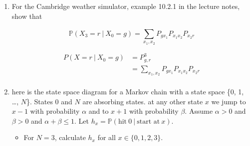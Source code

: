 \documentclass[10pt,\jkfside,a4paper]{article}
\begin{document}
\begin{enumerate}
\begin{center}
\end{center}

\item For the Cambridge weather simulator, example 10.2.1 in the lecture
notes, show that

\[
\mathbb{P}(X_3 = r \ | \ X_0 = g) = \sum^{}_{x_1, x_2}
P_{g x_1}P_{x_1 x_2}P_{x_2 r}
\]

\[
\begin{split}
P(X=r \ | \ X_0 = g)
&= P^3_{g, r} \\
&= \sum_{x_1, x_2}  P_{g x_1} P_{x_1 x_2} P_{x_2 r} \\
\end{split}
\]

\item here is the state space diagram for a Markov chain with a state space
\{0, 1, \dots, $N$\}. States 0 and $N$ are absorbing states. at any other
state $x$ we jump to $x - 1$ with probability $\alpha$ and to $x + 1$ with
probability $\beta$. Assume $\alpha > 0$ and $\beta > 0$ and $\alpha + \beta
\leq 1$. Let $h_x = \mathbb{P}(\text{hit} \ 0 \ | \ \text{start at} \ x)$.

\begin{itemize}

\item For $N = 3$, calculate $h_x$ for all $x \in \{0, 1, 2, 3\}$.


\end{itemize}
\end{enumerate}
\end{document}
